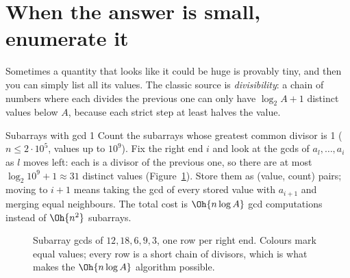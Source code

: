 \section[When the answer is small]{When the answer is small, enumerate it \hfill \plat}\label{sec:small-answer}

Sometimes a quantity that looks like it could be huge is provably tiny, and then you can simply list all its values. The
classic source is \emph{divisibility}: a chain of numbers where each divides the previous one can only have $\log_2 A + 1$
distinct values below $A$, because each strict step at least halves the value.

\begin{problem}{Subarrays with gcd 1}
Count the subarrays whose greatest common divisor is 1 ($n \le 2 \cdot 10^5$, values up to $10^9$).
\solution Fix the right end $i$ and look at the gcds of $a_l, \dots, a_i$ as $l$ moves left: each is a divisor of the
previous one, so there are at most $\log_2 10^9 + 1 \approx 31$ distinct values (Figure~\ref{fig:gcdchain}). Store them as
(value, count) pairs; moving to $i + 1$ means taking the gcd of every stored value with $a_{i+1}$ and merging equal
neighbours. The total cost is $\Oh{n \log A}$ gcd computations instead of $\Oh{n^2}$ subarrays.
\end{problem}

\begin{figure}[htbp]
\centering
{}
\caption{Subarray gcds of $12, 18, 6, 9, 3$, one row per right end. Colours mark equal values; every row is a short chain of
divisors, which is what makes the $\Oh{n \log A}$ algorithm possible.}
\label{fig:gcdchain}
\end{figure}

